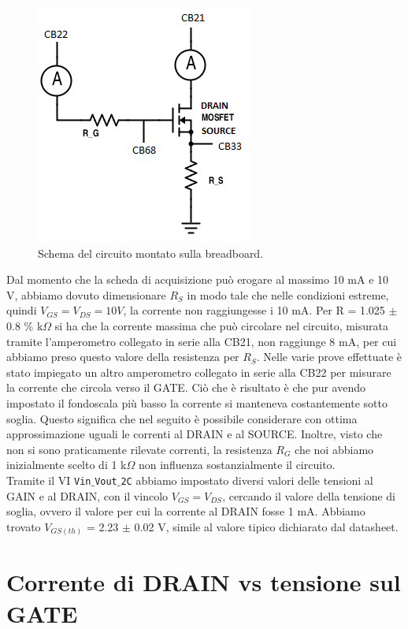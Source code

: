 \documentclass[journal, a4paper]{IEEEtran}
\begin{document}
\begin{figure}[htp]
\centering
\includegraphics[scale=.5]{mosfet}
\caption{Schema del circuito montato sulla breadboard.}
\label{fig:circ}
\end{figure}

Dal momento che la scheda di acquisizione può erogare al massimo 10 mA e 10 V, abbiamo dovuto dimensionare $R_S$ in modo tale che nelle condizioni estreme, quindi $V_{GS} = V_{DS} = 10 V$, la corrente non raggiungesse i 10 mA. Per R = 1.025 $\pm$ 0.8 $\%$ k$\Omega$ si ha che la corrente massima che può circolare nel circuito, misurata tramite l'amperometro collegato in serie alla CB21, non raggiunge 8 mA, per cui abbiamo preso questo valore della resistenza per $R_S$. Nelle varie prove effettuate è stato impiegato un altro amperometro collegato in serie alla CB22 per misurare la corrente che circola verso il GATE. Ciò che è risultato è che pur avendo impostato il fondoscala più basso la corrente si manteneva costantemente sotto soglia. Questo significa che nel seguito è possibile considerare con ottima approssimazione uguali le correnti al DRAIN e al SOURCE. Inoltre, visto che non si sono praticamente rilevate correnti, la resistenza $R_G$ che noi abbiamo inizialmente scelto di 1 k$\Omega$ non influenza sostanzialmente il circuito.\\
Tramite il VI \texttt{Vin$\_$Vout$\_$2C} abbiamo impostato diversi valori delle tensioni al GAIN e al DRAIN, con il vincolo $V_{GS} = V_{DS}$, cercando il valore della tensione di soglia, ovvero il valore per cui la corrente al DRAIN fosse 1 mA. Abbiamo trovato $V_{GS(th)}$ = 2.23 $\pm$ 0.02 V, simile al valore tipico dichiarato dal datasheet.

\section{Corrente di DRAIN vs tensione sul GATE}
\end{document}
